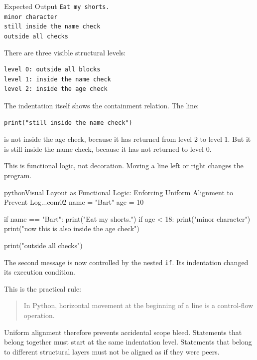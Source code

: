 \begin{iobox}{Expected Output}
\texttt{Eat my shorts.} \\
\texttt{minor character} \\
\texttt{still inside the name check} \\
\texttt{outside all checks} \\
\end{iobox}


There are three visible structural levels:

\begin{verbatim}
level 0: outside all blocks
level 1: inside the name check
level 2: inside the age check
\end{verbatim}

The indentation itself shows the containment relation. The line:

\begin{verbatim}
print("still inside the name check")
\end{verbatim}

is not inside the age check, because it has returned from level 2 to level 1. But it is still inside the name check, because it has not returned to level 0.

This is functional logic, not decoration. Moving a line left or right changes the program.

\begin{codebox}[]{python}{Visual Layout as Functional Logic: Enforcing Uniform Alignment to Prevent Log...}{com02}
name = "Bart"
age = 10

if name == "Bart":
    print("Eat my shorts.")
    if age < 18:
        print("minor character")
        print("now this is also inside the age check")

print("outside all checks")
\end{codebox}


The second message is now controlled by the nested \texttt{if}. Its indentation changed its execution condition.

This is the practical rule:

\begin{quote}
In Python, horizontal movement at the beginning of a line is a control-flow operation.
\end{quote}

Uniform alignment therefore prevents accidental scope bleed. Statements that belong together must start at the same indentation level. Statements that belong to different structural layers must not be aligned as if they were peers.

